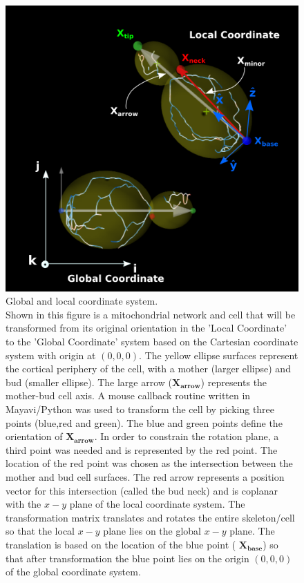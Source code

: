\begin{figure}[htp]
	\centering
    \includegraphics[width=.8\textwidth]{coors}
    \caption[Global and local coordinate system]{Global and local coordinate system.\\Shown in this figure is a mitochondrial network and cell that will be transformed from its original orientation in the 'Local Coordinate' to the 'Global Coordinate' system based on the Cartesian coordinate system with origin at $(0,0,0)$. The yellow ellipse surfaces represent the cortical periphery of the cell, with a mother (larger ellipse) and bud (smaller ellipse). The large arrow ($\mathbf{X_{arrow}}$) represents the mother-bud cell axis. A mouse callback routine written in Mayavi/Python was used to transform the cell by picking three points (blue,red and green). The blue and green points define the orientation of  $\mathbf{X_{arrow}}$. In order to constrain the rotation plane, a third point was needed and is represented by the red point. The location of the red point was chosen as the intersection between the mother and bud cell surfaces. The red arrow represents a position vector for this intersection (called the bud neck) and is coplanar with the $x-y$ plane of the local coordinate system. The transformation matrix translates and rotates the entire skeleton/cell so that the local $x-y$ plane lies on the global $x-y$ plane. The translation is based on the location of the blue point ( $\mathbf{X_{base}}$) so that after transformation the blue point lies on the origin $(0,0,0)$ of the global coordinate system.}\label{fig:coors}
\end{figure}
